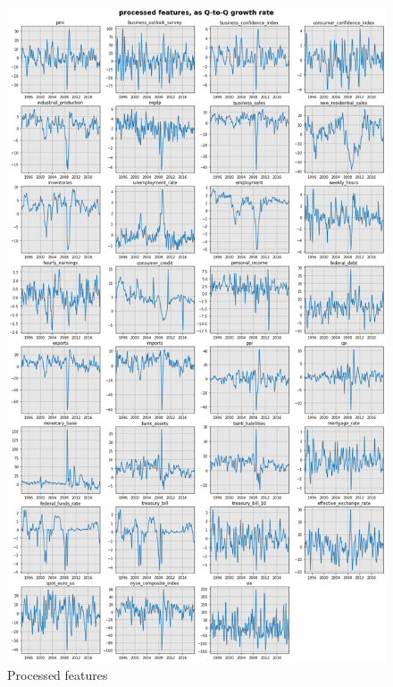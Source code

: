 \newpage

\begin{figure}[H]
\centering
\includegraphics[scale=0.36]{images/processed_features.png}
\caption{Processed features}
\label{fig_c2_s3_2}
\end{figure}

